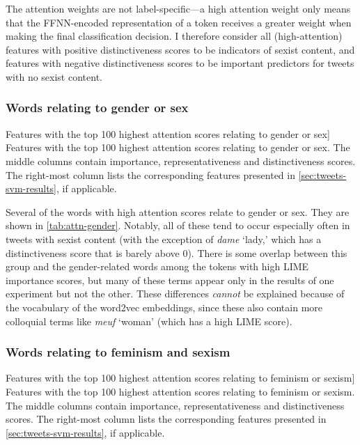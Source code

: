 The attention weights are not label-specific---a high attention weight only means that the FFNN-encoded representation of a token receives a greater weight when making the final classification decision.
I therefore consider all (high-attention) features with positive distinctiveness scores to be indicators of sexist content, and features with negative distinctiveness scores to be important predictors for tweets with no sexist content.


\subsubsection{Words relating to gender or sex}
\begin{table}[htbp]
    
    \caption
    [Features with the top 100 highest attention scores relating to gender or sex]
    {Features with the top 100 highest attention scores relating to gender or sex.
    The middle columns contain importance, representativeness and distinctiveness\protect\footnotemark{} scores.
    The right-most column lists the corresponding features presented in \autoref{sec:tweets-svm-results}, if applicable.
    }
    \label{tab:attn-gender}
\end{table}

Several of the words with high attention scores relate to gender or sex.
They are shown in \autoref{tab:attn-gender}.
Notably, all of these tend to occur especially often in tweets with sexist content (with the exception of \textit{dame} `lady,' which has a distinctiveness score that is barely above 0).
There is some overlap between this group and the gender-related words among the tokens with high LIME importance scores, but many of these terms appear only in the results of one experiment but not the other.
These differences \textit{cannot} be explained because of the vocabulary of the word2vec embeddings, since these also contain more colloquial terms like \textit{meuf} `woman' (which has a high LIME score).

\subsubsection{Words relating to feminism and sexism}
\begin{table}[htbp]
    
    \caption
    [Features with the top 100 highest attention scores relating to feminism or sexism]
    {Features with the top 100 highest attention scores relating to feminism or sexism.
    The middle columns contain importance, representativeness and distinctiveness scores.
    The right-most column lists the corresponding features presented in \autoref{sec:tweets-svm-results}, if applicable.
    }
    \label{tab:attn-feminism}
\end{table}

